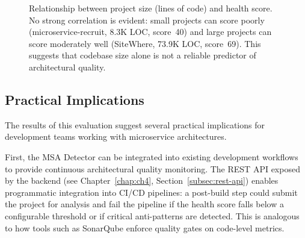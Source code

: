 \begin{figure}[htbp]
    \centering
    \caption{Relationship between project size (lines of code) and health score. No strong correlation is evident: small projects can score poorly (microservice-recruit, 8.3K LOC, score~40) and large projects can score moderately well (SiteWhere, 73.9K LOC, score~69). This suggests that codebase size alone is not a reliable predictor of architectural quality.}
    \label{fig:loc-vs-health}
\end{figure}

\subsection{Practical Implications}
\label{subsec:practical-implications}

\par The results of this evaluation suggest several practical implications for development teams working with microservice architectures.

\par First, the MSA Detector can be integrated into existing development workflows to provide continuous architectural quality monitoring. The REST API exposed by the backend (see Chapter~\ref{chap:ch4}, Section~\ref{subsec:rest-api}) enables programmatic integration into CI/CD pipelines: a post-build step could submit the project for analysis and fail the pipeline if the health score falls below a configurable threshold or if critical anti-patterns are detected. This is analogous to how tools such as SonarQube enforce quality gates on code-level metrics.

